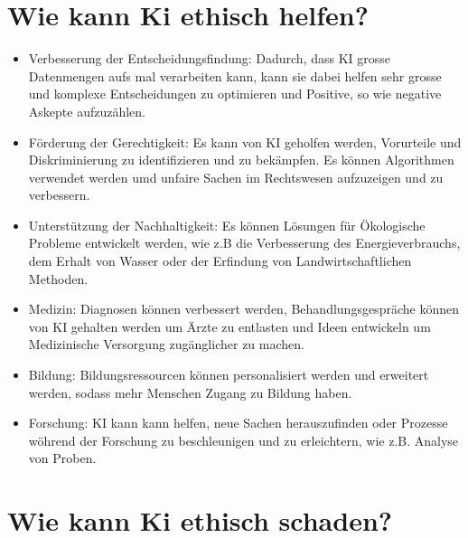 \documentclass{report}
\begin{document}
\section{Wie kann Ki ethisch helfen?}
\begin{itemize}
    \item Verbesserung der Entscheidungsfindung: Dadurch, dass KI grosse Datenmengen aufs mal verarbeiten kann, kann sie dabei helfen sehr grosse und komplexe Entscheidungen zu optimieren und Positive, so wie negative Askepte aufzuzählen. 
    \item Förderung der Gerechtigkeit: Es kann von KI geholfen werden, Vorurteile und Diskriminierung zu identifizieren und zu bekämpfen. Es können Algorithmen verwendet werden umd unfaire Sachen im Rechtswesen aufzuzeigen und zu verbessern.
    \item Unterstützung der Nachhaltigkeit: Es können Lösungen für Ökologische Probleme entwickelt werden, wie z.B die Verbesserung des Energieverbrauchs, dem Erhalt von Wasser oder der Erfindung von Landwirtschaftlichen Methoden.
    \item Medizin: Diagnosen können verbessert werden, Behandlungsgespräche können von KI gehalten werden um Ärzte zu entlasten und Ideen entwickeln um Medizinische Versorgung zugänglicher zu machen.
    \item Bildung: Bildungsressourcen können personalisiert werden und erweitert werden, sodass mehr Menschen Zugang zu Bildung haben.
    \item Forschung: KI kann kann helfen, neue Sachen herauszufinden oder Prozesse wöhrend der Forschung zu beschleunigen und zu erleichtern, wie z.B. Analyse von Proben.
\end{itemize}

\section{Wie kann Ki ethisch schaden?}

\printbibliography
\end{document}
